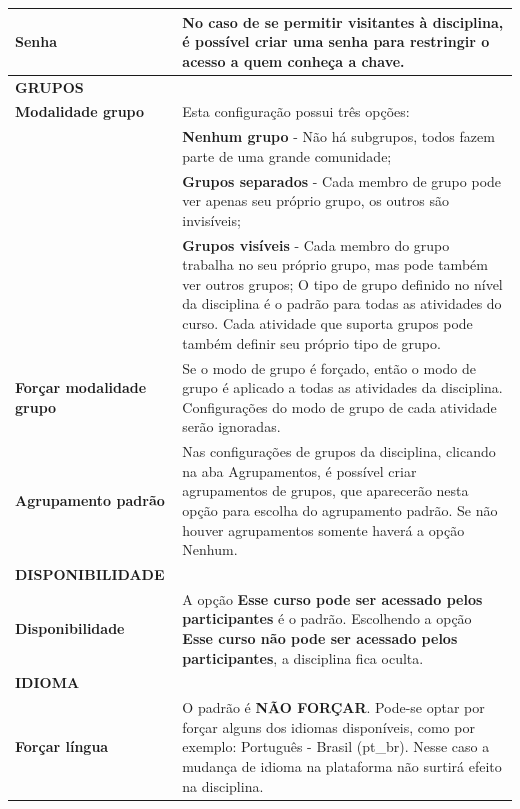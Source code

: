 \begin{longtable}[htbp] {p{6cm}|p{9cm}}
\textbf{Senha} & No caso de se permitir visitantes à disciplina, é possível criar uma senha para restringir o acesso a quem conheça a chave.\\\hline
\rowcolor[rgb]{0.8,0.8,0.8} \textbf{GRUPOS}&\\\hline
\textbf{Modalidade grupo} & Esta configuração possui três opções:\\
&\textbf{Nenhum grupo} - Não há subgrupos, todos fazem parte de uma grande comunidade;\\
&\textbf{Grupos separados} - Cada membro de grupo pode ver apenas seu próprio grupo, os outros são invisíveis;\\
&\textbf{Grupos visíveis} - Cada membro do grupo trabalha no seu próprio grupo, mas pode também ver outros grupos;
O tipo de grupo definido no nível da disciplina é o padrão para todas as atividades do curso. Cada atividade que suporta grupos pode também definir seu próprio tipo de grupo.
\\\hline
\textbf{Forçar modalidade grupo}& Se o modo de grupo é forçado, então o modo de grupo é aplicado a todas as atividades da disciplina. Configurações do modo de grupo de cada atividade serão ignoradas.\\\hline
\textbf{Agrupamento padrão} & Nas configurações de grupos da disciplina, clicando na aba Agrupamentos, é possível criar agrupamentos de grupos, que aparecerão nesta opção para escolha do agrupamento padrão. Se não houver agrupamentos somente haverá a opção Nenhum.\\\hline
\rowcolor[rgb]{0.8,0.8,0.8} \textbf{DISPONIBILIDADE}&\\\hline
\textbf{Disponibilidade }& A opção \textbf{Esse curso pode ser acessado pelos participantes} é o padrão. Escolhendo a opção \textbf{Esse curso não pode ser acessado pelos participantes}, a disciplina fica oculta.\\\hline

\rowcolor[rgb]{0.8,0.8,0.8} \textbf{IDIOMA}&\\\hline
\textbf{Forçar língua} & O padrão é \textbf{NÃO FORÇAR}. Pode-se optar por forçar alguns dos idiomas disponíveis, como por exemplo: Português - Brasil (pt\_br). Nesse caso a mudança de idioma na plataforma não surtirá efeito na disciplina.\\\hline


\end{longtable}
